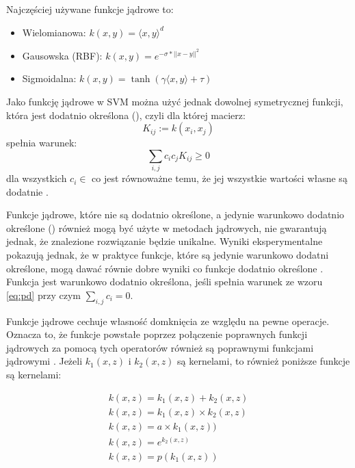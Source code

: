 Najczęściej używane funkcje jądrowe to:	
\begin{itemize}
	\item Wielomianowa: $ k(x, y) = \langle x,y \rangle ^d $
	\item Gausowska (RBF): $k(x, y) =  e^{-\sigma*||x-y||^2} $	
	\item Sigmoidalna: $ k(x, y) = \tanh(\gamma \langle x,y \rangle + \tau) $
\end{itemize}

Jako funkcję jądrowe w SVM można użyć jednak dowolnej symetrycznej funkcji, która jest dodatnio określona (), czyli dla której macierz:
$$ K_{ij} := k(x_i, x_j) $$
spełnia warunek:
\begin{equation}
\label{eq:pd}
\sum_{i,j}c_i c_j K_{ij} \geq 0
\end{equation} 
dla wszystkich $ c_i \in  $
co jest równoważne temu, że jej wszystkie wartości własne są dodatnie \cite{scholkopf_learning_2002}.


Funkcje jądrowe, które nie są dodatnio określone, a jedynie warunkowo dodatnio określone () również mogą być użyte w metodach jądrowych, nie gwarantują jednak, że znalezione rozwiązanie będzie unikalne. Wyniki eksperymentalne pokazują jednak, że w praktyce funkcje, które są jedynie warunkowo dodatni określone, mogą dawać równie dobre wyniki co funkcje dodatnio określone \cite{conditionally2005Boughorbel}. Funkcja jest warunkowo dodatnio określona, jeśli spełnia warunek ze wzoru \ref{eq:pd} przy czym $ \sum_{i,j} c_i = 0 $.


Funkcje jądrowe cechuje własność domknięcia ze względu na pewne operacje. Oznacza to, że funkcje powstałe poprzez połączenie poprawnych funkcji jądrowych za pomocą tych operatorów również są poprawnymi funkcjami jądrowymi \cite{Shawe-Taylor:2004:KMP:975545}. Jeżeli $ k_1(x, z) $ i $ k_2 (x,z) $ są kernelami, to również poniższe funkcje są kernelami:

\begin{equation}
\begin{array}{ll}
	k(x, z) = k_1(x,z) + k_2(x,z) \\
	k(x, z) = k_1(x,z) \times k_2(x,z) \\
	k(x, z) = a \times k_1(x,z)) \\
	k(x, z) = e^{k_2(x,z)} \\
	k(x, z) = p(k_1(x,z)) 	
\end{array}
\label{eq:kernelclosure}
\end{equation}

